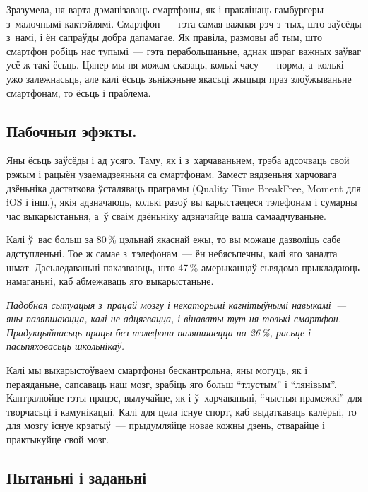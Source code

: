 Зразумела, ня варта дэманізаваць смартфоны, як і праклінаць гамбургеры з~малочнымі кактэйлямі. Смартфон~--- гэта самая важная рэч з~тых, што заўсёды з~намі, і ён сапраўды добра дапамагае. Як правіла, размовы аб тым, што смартфон робіць нас тупымі~--- гэта перабольшаньне, аднак шэраг важных заўваг усё ж такі ёсьць. Цяпер мы ня можам сказаць, колькі часу~--- норма, а~колькі~--- ужо залежнасьць, але калі ёсьць зьніжэньне якасьці жыцьця праз злоўжываньне смартфонам, то ёсьць і праблема.

\subsection*{Пабочныя эфэкты.}

Яны ёсьць заўсёды і ад усяго. Таму, як і з~харчаваньнем, трэба адсочваць свой рэжым і рацыён узаемадзеяньня са смартфонам. Замест вядзеньня харчовага дзёньніка дастаткова ўсталяваць праграмы (Quality Time BreakFree, Moment для iOS і інш.), якія адзначаюць, колькі разоў вы карыстаецеся тэлефонам і сумарны час выкарыстаньня, а~ў сваім дзёньніку адзначайце ваша самаадчуваньне.


Калі ў~вас больш за 80\,\% цэльнай якаснай ежы, то вы можаце дазволіць сабе адступленьні. Тое ж самае з~тэлефонам~--- ён небясьпечны, калі яго занадта шмат. Дасьледаваньні паказваюць, што 47\,\% амерыканцаў сьвядома прыкладаюць намаганьні, каб абмежаваць яго выкарыстаньне.

\emph{Падобная сытуацыя з~працай мозгу і некаторымі кагнітыўнымі навыкамі~--- яны паляпшаюцца, калі не адцягвацца, і вінаваты тут ня толькі смартфон. Прадукцыйнасьць працы без тэлефона паляпшаецца на 26\,\%, расьце і пасьпяховасьць школьнікаў.}

Калі мы выкарыстоўваем смартфоны бескантрольна, яны могуць, як і пераяданьне, сапсаваць наш мозг, зрабіць яго больш ``тлустым'' і ``лянівым''. Кантралюйце гэты працэс, вылучайце, як і ў~харчаваньні, ``чыстыя прамежкі'' для творчасьці і камунікацыі. Калі для цела існуе спорт, каб выдаткаваць калёрыі, то для мозгу існуе крэатыў~--- прыдумляйце новае кожны дзень, стварайце і практыкуйце свой мозг.

\subsection*{Пытаньні і заданьні}

